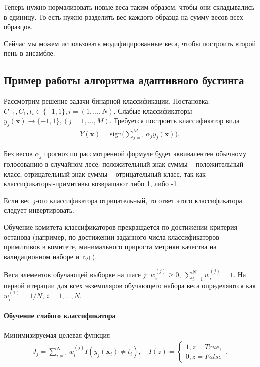 \documentclass[%
	11pt,
	a4paper,
	utf8,
		]{article}
\begin{document}
Теперь нужно нормализовать новые веса таким образом, чтобы они складывались в единицу. То есть нужно разделить вес каждого образца на сумму весов всех образцов.

Сейчас мы можем использовать модифицированные веса, чтобы построить второй пень в ансамбле.

\subsection{Пример работы алгоритма адаптивного бустинга}

Рассмотрим решение задачи бинарной классификации. Постановка: $ C_{-1}, C_1, t_i \in \{-1, 1\}, i = (1, \ldots, N) $. Слабые классификаторы $ y_j(\mathbf{x}) \rightarrow \{-1, 1\}, (j = 1,\ldots, M) $. Требуется построить классификатор вида
\begin{align*}
	Y(\mathbf{x}) = \text{sign} \Big(\sum_{j=1}^{M} \alpha_j y_j(\mathbf{x})\Big).
\end{align*}

Без весов $ \alpha_j $ прогноз по рассмотренной формуле будет эквивалентен обычному голосованию в случайном лесе: положительный знак суммы -- положительный класс, отрицательный знак суммы -- отрицательный класс, так как классификаторы-примитивы возвращают либо 1, либо -1.

Если вес $ j $-ого классификатора отрицательный, то ответ этого классификатора следует инвертировать.

Обучение комитета классификаторов прекращается по достижении критерия останова (например, по достижении заданного числа классификаторов-примитивов в комитете, минимального прироста метрики качества на валидационном наборе и т.д.).

Веса элементов обучающей выборке на шаге $ j $: $ w_i^{(j)} \geqslant 0,\ \sum\limits_{i=1}^N w_i^{(j)} = 1 $. На первой итерации для всех экземпляров обучающего набора веса определяются как $ w_i^{(1)} = 1/N,\ i = 1, \ldots, N $.

\paragraph{Обучение слабого классификатора} Минимизируемая целевая функция
\begin{align*}
	J_j = \sum_{i=1}^{N} w_i^{(j)} I(y_j(\mathbf{x}_i) \neq t_i), \quad I(z) =
	\begin{cases}
		1, z=True,\\
		0, z=False
	\end{cases}.
\end{align*} 
\end{document}
